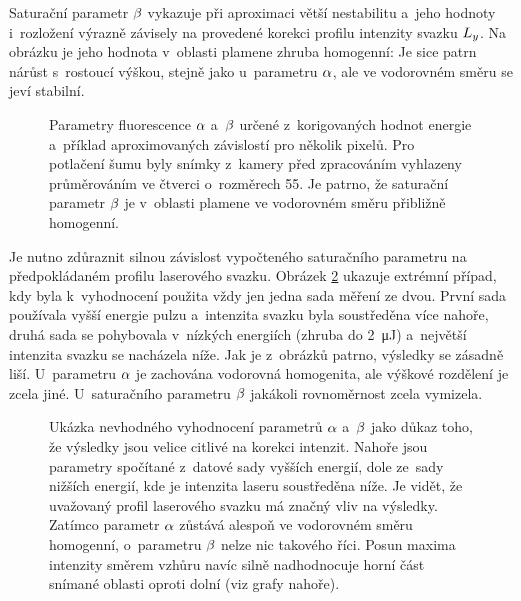 Saturační parametr $\beta$ vykazuje při aproximaci větší nestabilitu
a~jeho hodnoty i~rozložení výrazně závisely na provedené korekci profilu
intenzity svazku $L_y$.
Na obrázku je jeho hodnota v~oblasti plamene zhruba homogenní:
Je sice patrn nárůst s~rostoucí výškou, stejně jako u~parametru $\alpha$,
ale ve vodorovném směru se jeví stabilní.

\begin{figure}
	\centering
	\small
	
	\caption{Parametry fluorescence $\alpha$ a~$\beta$
		určené z~korigovaných hodnot energie
		a~příklad aproximovaných závislostí pro několik pixelů.
		Pro potlačení šumu byly snímky z~kamery před zpracováním vyhlazeny
		průměrováním ve čtverci o~rozměrech \num{5}\times\SI{5}{\pixel}.
		Je patrno, že saturační parametr $\beta$ je
		v~oblasti plamene ve vodorovném směru přibližně homogenní.}
	\label{fig:lif-saturation-full-params}
\end{figure}

Je nutno zdůraznit silnou závislost vypočteného saturačního parametru
na předpokládaném profilu laserového svazku.
Obrázek \ref{fig:lif-saturation-full-params-bad} ukazuje extrémní případ,
kdy byla k~vyhodnocení použita vždy jen jedna sada měření ze dvou.
První sada používala vyšší energie pulzu a~intenzita svazku byla soustředěna
více nahoře, druhá sada se pohybovala v~nízkých energiích
(zhruba do \SI{2}{\micro\joule}) a~největší intenzita svazku se nacházela níže.
Jak je z~obrázků patrno, výsledky se zásadně liší.
U~parametru $\alpha$ je zachována vodorovná homogenita,
ale výškové rozdělení je zcela jiné.
U~saturačního parametru $\beta$ jakákoli rovnoměrnost zcela vymizela.

\begin{figure}[htp]
	\centering
	\small
	
	\caption{Ukázka nevhodného vyhodnocení parametrů $\alpha$ a~$\beta$
		jako důkaz toho, že výsledky jsou velice citlivé na korekci intenzit.
		Nahoře jsou parametry spočítané z~datové sady vyšších energií,
		dole ze~sady nižších energií, kde je intenzita laseru soustředěna níže.
		Je vidět, že uvažovaný profil laserového svazku má značný vliv
		na výsledky.
		Zatímco parametr $\alpha$ zůstává alespoň ve vodorovném směru
		homogenní, o~parametru $\beta$ nelze nic takového říci.
		Posun maxima intenzity směrem vzhůru navíc silně nadhodnocuje
		horní část snímané oblasti oproti dolní (viz grafy nahoře).}
	\label{fig:lif-saturation-full-params-bad}
\end{figure}

